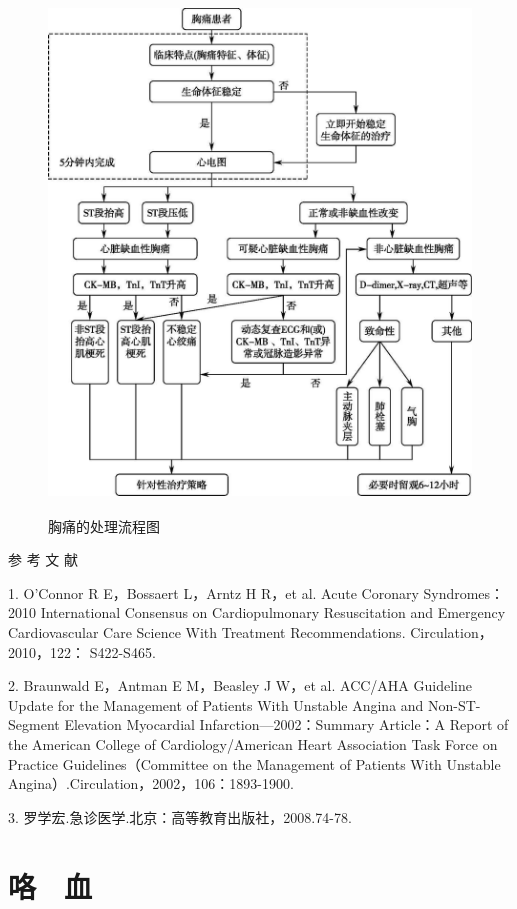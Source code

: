 \begin{figure}[!htbp]
 \centering
 \includegraphics[width=4.69792in,height=5.41667in]{./images/Image00044.jpg}
 \captionsetup{justification=centering}
 \caption{胸痛的处理流程图}
 \label{fig8-1}
  \end{figure} 

\hypertarget{text00023.htmlux5cux23CHP1-8-4}{}
参 考 文 献

1. O'Connor R E，Bossaert L，Arntz H R，et al. Acute Coronary
Syndromes：2010 International Consensus on Cardiopulmonary Resuscitation
and Emergency Cardiovascular Care Science With Treatment
Recommendations. Circulation，2010，122： S422-S465.

2. Braunwald E，Antman E M，Beasley J W，et al. ACC/AHA Guideline Update
for the Management of Patients With Unstable Angina and Non-ST-Segment
Elevation Myocardial Infarction---2002：Summary Article：A Report of the
American College of Cardiology/American Heart Association Task Force on
Practice Guidelines（Committee on the Management of Patients With
Unstable Angina）.Circulation，2002，106：1893-1900.

3. 罗学宏.急诊医学.北京：高等教育出版社，2008.74-78.

\protect\hypertarget{text00024.html}{}{}

\chapter{咯　血}

